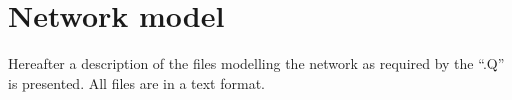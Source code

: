 \documentclass[10pt, conference, compsocconf]{IEEEtran}
\begin{document}
%
%
%
%

\section{Network model}\label{sect-nets-model}
Hereafter a description of the files modelling the network as required by the  ``.Q'' is presented.
All files are in a text format.
\end{document}
